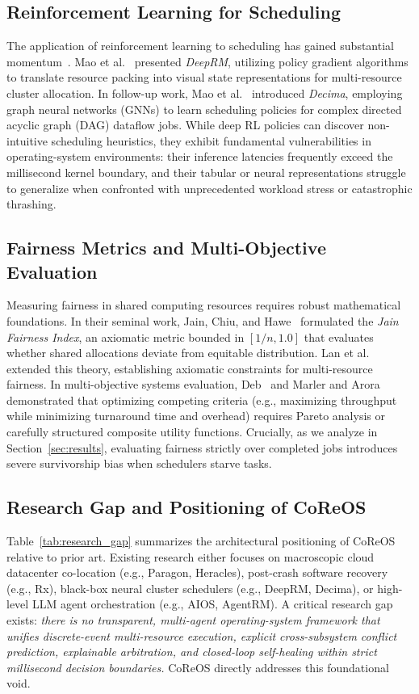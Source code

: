 \documentclass[conference]{IEEEtran}
\begin{document}
\subsection{Reinforcement Learning for Scheduling}
The application of reinforcement learning to scheduling has gained substantial momentum~\cite{sutton2018reinforcement}. Mao et al.~\cite{mao2016resource} presented \textit{DeepRM}, utilizing policy gradient algorithms to translate resource packing into visual state representations for multi-resource cluster allocation. In follow-up work, Mao et al.~\cite{mao2019learning} introduced \textit{Decima}, employing graph neural networks (GNNs) to learn scheduling policies for complex directed acyclic graph (DAG) dataflow jobs. While deep RL policies can discover non-intuitive scheduling heuristics, they exhibit fundamental vulnerabilities in operating-system environments: their inference latencies frequently exceed the millisecond kernel boundary, and their tabular or neural representations struggle to generalize when confronted with unprecedented workload stress or catastrophic thrashing.

\subsection{Fairness Metrics and Multi-Objective Evaluation}
Measuring fairness in shared computing resources requires robust mathematical foundations. In their seminal work, Jain, Chiu, and Hawe~\cite{jain1984quantitative} formulated the \textit{Jain Fairness Index}, an axiomatic metric bounded in $[1/n, 1.0]$ that evaluates whether shared allocations deviate from equitable distribution. Lan et al.~\cite{lan2010axiomatic} extended this theory, establishing axiomatic constraints for multi-resource fairness. In multi-objective systems evaluation, Deb~\cite{deb2001multi} and Marler and Arora~\cite{marler2004survey} demonstrated that optimizing competing criteria (e.g., maximizing throughput while minimizing turnaround time and overhead) requires Pareto analysis or carefully structured composite utility functions. Crucially, as we analyze in Section~\ref{sec:results}, evaluating fairness strictly over completed jobs introduces severe survivorship bias when schedulers starve tasks.

\subsection{Research Gap and Positioning of CoReOS}
Table~\ref{tab:research_gap} summarizes the architectural positioning of CoReOS relative to prior art. Existing research either focuses on macroscopic cloud datacenter co-location (e.g., Paragon, Heracles), post-crash software recovery (e.g., Rx), black-box neural cluster schedulers (e.g., DeepRM, Decima), or high-level LLM agent orchestration (e.g., AIOS, AgentRM). A critical research gap exists: \textit{there is no transparent, multi-agent operating-system framework that unifies discrete-event multi-resource execution, explicit cross-subsystem conflict prediction, explainable arbitration, and closed-loop self-healing within strict millisecond decision boundaries.} CoReOS directly addresses this foundational void.
\end{document}
